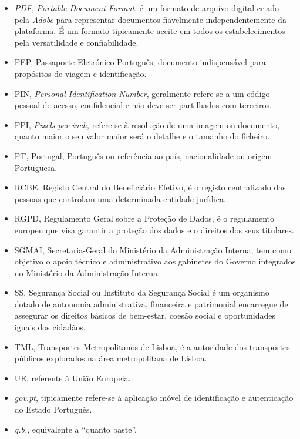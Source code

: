 \begin{itemize}
	\item \emph{PDF}, \emph{Portable Document Format}, é um formato de arquivo digital criado pela \emph{Adobe} para representar documentos fiavelmente independentemente da plataforma. É um formato tipicamente aceite em todos os estabelecimentos pela versatilidade e confiabilidade.
	\item PEP, Passaporte Eletrónico Português, documento indispensável para propósitos de viagem e identificação.
	\item PIN, \emph{Personal Identification Number}, geralmente refere-se a um código pessoal de acesso, confidencial e não deve ser partilhados com terceiros.
	\item PPI, \emph{Pixels per inch}, refere-se à resolução de uma imagem ou documento, quanto maior o seu valor maior será o detalhe e o tamanho do ficheiro.
	\item PT, Portugal, Português ou referência ao país, nacionalidade ou origem Portuguesa.
	\item RCBE, Registo Central do Beneficiário Efetivo, é o registo centralizado das pessoas que controlam uma determinada entidade jurídica.
	\item RGPD, Regulamento Geral sobre a Proteção de Dados, é o regulamento europeu que visa garantir a proteção dos dados e o direitos dos seus titulares.
	\item SGMAI, Secretaria-Geral do Ministério da Administração Interna, tem como objetivo o apoio técnico e administrativo aos gabinetes do Governo integrados no Ministério da Administração Interna.
	\item SS, Segurança Social ou Instituto da Segurança Social é um organismo dotado de autonomia administrativa, financeira e patrimonial encarregue de assegurar os direitos básicos de bem-estar, coesão social e oportunidades iguais dos cidadãos.
	\item TML, Transportes Metropolitanos de Lisboa, é a autoridade dos transportes públicos explorados na área metropolitana de Lisboa.
	\item UE, referente à União Europeia.
	\item \emph{gov.pt}, tipicamente refere-se à aplicação móvel de identificação e autenticação do Estado Português.
	\item \emph{q.b.}, equivalente a ``quanto baste''.
\end{itemize}